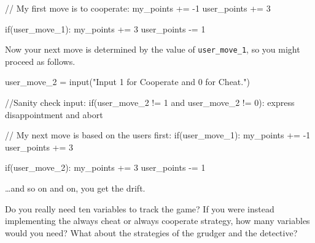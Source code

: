 \documentclass[
  letterpaper,
  DIV=11,
  numbers=noendperiod]{scrreprt}
\newenvironment{Shaded}{\begin{snugshade}}{\end{snugshade}}
\newcommand{\CommentTok}[1]{\textcolor[rgb]{0.37,0.37,0.37}{#1}}
\newcommand{\ControlFlowTok}[1]{\textcolor[rgb]{0.00,0.23,0.31}{#1}}
\newcommand{\DecValTok}[1]{\textcolor[rgb]{0.68,0.00,0.00}{#1}}
\newcommand{\FunctionTok}[1]{\textcolor[rgb]{0.28,0.35,0.67}{#1}}
\newcommand{\NormalTok}[1]{\textcolor[rgb]{0.00,0.23,0.31}{#1}}
\newcommand{\OperatorTok}[1]{\textcolor[rgb]{0.37,0.37,0.37}{#1}}
\newcommand{\StringTok}[1]{\textcolor[rgb]{0.13,0.47,0.30}{#1}}
\begin{document}
\begin{Shaded}
\begin{Highlighting}[]
\CommentTok{// My first move is to cooperate:}
\NormalTok{my\_points }\OperatorTok{+=} \OperatorTok{{-}}\DecValTok{1}
\NormalTok{user\_points }\OperatorTok{+=} \DecValTok{3}

\ControlFlowTok{if}\OperatorTok{(}\NormalTok{user\_move\_1}\OperatorTok{):}
\NormalTok{    my\_points }\OperatorTok{+=} \DecValTok{3}
\NormalTok{    user\_points }\OperatorTok{{-}=} \DecValTok{1}
\end{Highlighting}
\end{Shaded}

Now your next move is determined by the value of \texttt{user\_move\_1},
so you might proceed as follows.

\begin{Shaded}
\begin{Highlighting}[]
\NormalTok{user\_move\_2 }\OperatorTok{=} \FunctionTok{input}\OperatorTok{(}\StringTok{"Input 1 for Cooperate and 0 for Cheat."}\OperatorTok{)}

\CommentTok{//Sanity check input:}
\ControlFlowTok{if}\OperatorTok{(}\NormalTok{user\_move\_2 }\OperatorTok{!=} \DecValTok{1}\NormalTok{ and user\_move\_2 }\OperatorTok{!=} \DecValTok{0}\OperatorTok{):}
\NormalTok{    express disappointment and abort}
\end{Highlighting}
\end{Shaded}

\begin{Shaded}
\begin{Highlighting}[]
\CommentTok{// My next move is based on the user\textquotesingle{}s first:}
\ControlFlowTok{if}\OperatorTok{(}\NormalTok{user\_move\_1}\OperatorTok{):}
\NormalTok{    my\_points }\OperatorTok{+=} \OperatorTok{{-}}\DecValTok{1}
\NormalTok{    user\_points }\OperatorTok{+=} \DecValTok{3}

\ControlFlowTok{if}\OperatorTok{(}\NormalTok{user\_move\_2}\OperatorTok{):}
\NormalTok{    my\_points }\OperatorTok{+=} \DecValTok{3}
\NormalTok{    user\_points }\OperatorTok{{-}=} \DecValTok{1}
\end{Highlighting}
\end{Shaded}

\ldots and so on and on, you get the drift.

\begin{tcolorbox}[standard jigsaw,titlerule=0mm, leftrule=.75mm, colbacktitle=quarto-callout-caution-color!10!white, toptitle=1mm, toprule=.15mm, colframe=quarto-callout-caution-color-frame, colback=white, coltitle=black, title=\textcolor{quarto-callout-caution-color}{\faFire}\hspace{0.5em}{Food for thought.}, bottomrule=.15mm, rightrule=.15mm, bottomtitle=1mm, left=2mm, opacitybacktitle=0.6, arc=.35mm, opacityback=0]
Do you really need ten variables to track the game? If you were instead
implementing the always cheat or always cooperate strategy, how many
variables would you need? What about the strategies of the grudger and
the detective?
\end{tcolorbox}
\end{document}
